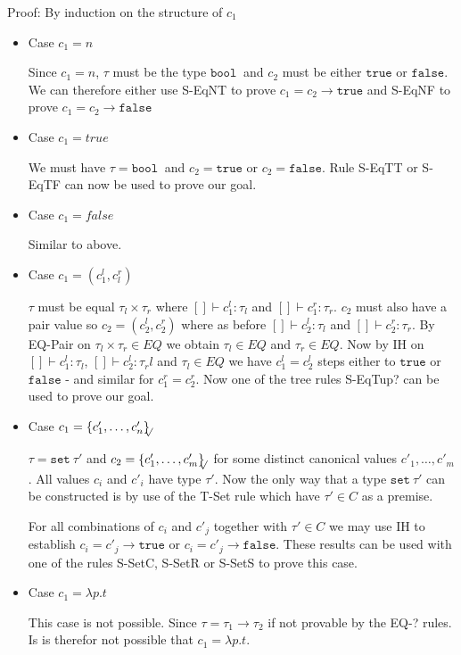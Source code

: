 \documentclass[a4paper]{article}
\newcommand{\s}[1]{\mathtt{#1}}
\newcommand{\sLb}{\s{\{}}
\newcommand{\sRb}{\s{\}}}
\newcommand{\sbool}{\s{bool\ }}
\newcommand{\sseta}{\s{set\ }}
\newcommand{\strue}{\s{true}}
\newcommand{\sfalse}{\s{false}}
\newcommand{\sset}[1]{\sLb #1 \sRb}
\newcommand{\ssetc}[1]{\sset{#1}_{\!\!\!\surd}}
\newcommand{\step}{\to}
\begin{document}
Proof: By induction on the structure of $c_1$
\begin{itemize}
\item Case $c_1 = n$

Since $c_1 = n$, $\tau$ must be the type $\sbool$ and $c_2$ must be either $\strue$ or $\sfalse$. We can therefore either use S-EqNT to prove $c_1 = c_2 \step \strue$ and S-EqNF to prove $c_1 = c_2 \step \sfalse$

\item Case $c_1 = true$

We must have $\tau = \sbool$ and $c_2 = \strue$ or $c_2 = \sfalse$. Rule S-EqTT or S-EqTF can now be used to prove our goal.

\item Case $c_1 = false$

Similar to above.

\item Case $c_1 = (c_1^l, c_l^r)$

$\tau$ must be equal $\tau_l \times \tau_r$ where $[]\vdash c_1^l:\tau_l$ and $[]\vdash c_1^r:\tau_r$. $c_2$ must also have a pair value so $c_2 = (c_2^l, c_2^r)$ where as before $[]\vdash c_2^l:\tau_l$ and $[]\vdash c_2^r:\tau_r$. By EQ-Pair on $\tau_l \times \tau_r \in EQ$ we obtain $\tau_l \in EQ$ and $\tau_r \in EQ$. Now by IH on $[]\vdash c_1^l:\tau_l$, $[]\vdash c_2^l:\tau_rl$ and $\tau_l \in EQ$ we have $c_1^l = c_2^l$ steps either to $\strue$ or $\sfalse$ - and similar for $c_1^r = c_2^r$. Now one of the tree rules S-EqTup? can be used to prove our goal.

\item Case $c_1 = \ssetc{c'_1,\ldots,c'_n}$

$\tau = \sseta \tau'$ and $c_2 = \ssetc{c'_1,\ldots,c'_m}$ for some distinct canonical values $c'_1,\ldots,c'_m$. All values $c_i$ and $c'_i$ have type $\tau'$. Now the only way that a type $\sseta \tau'$ can be constructed is by use of the T-Set rule which have $\tau' \in C$ as a premise.

For all combinations of $c_i$ and $c'_j$ together with $\tau' \in C$ we may use IH to establish $c_i = c'_j \step \strue$ or $c_i = c'_j \step \sfalse$. These results can be used with one of the rules S-SetC, S-SetR or S-SetS to prove this case.

\item Case $c_1 = \lambda p.t$

This case is not possible. Since $\tau = \tau_1 \to \tau_2$ if not provable by the EQ-? rules. Is is therefor not possible that $c_1 = \lambda p.t$.
\end{itemize}
\end{document}
